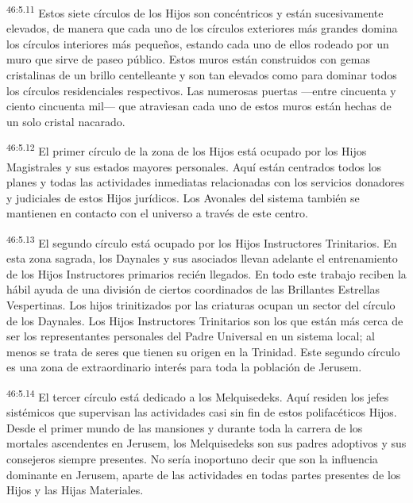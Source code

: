 \par
\textsuperscript{46:5.11} Estos siete círculos de los Hijos son concéntricos y están sucesivamente elevados, de manera que cada uno de los círculos exteriores más grandes domina los círculos interiores más pequeños, estando cada uno de ellos rodeado por un muro que sirve de paseo público. Estos muros están construidos con gemas cristalinas de un brillo centelleante y son tan elevados como para dominar todos los círculos residenciales respectivos. Las numerosas puertas ---entre cincuenta y ciento cincuenta mil--- que atraviesan cada uno de estos muros están hechas de un solo cristal nacarado.

\par
\textsuperscript{46:5.12} El primer círculo de la zona de los Hijos está ocupado por los Hijos Magistrales y sus estados mayores personales. Aquí están centrados todos los planes y todas las actividades inmediatas relacionadas con los servicios donadores y judiciales de estos Hijos jurídicos. Los Avonales del sistema también se mantienen en contacto con el universo a través de este centro.

\par
\textsuperscript{46:5.13} El segundo círculo está ocupado por los Hijos Instructores Trinitarios. En esta zona sagrada, los Daynales y sus asociados llevan adelante el entrenamiento de los Hijos Instructores primarios recién llegados. En todo este trabajo reciben la hábil ayuda de una división de ciertos coordinados de las Brillantes Estrellas Vespertinas. Los hijos trinitizados por las criaturas ocupan un sector del círculo de los Daynales. Los Hijos Instructores Trinitarios son los que están más cerca de ser los representantes personales del Padre Universal en un sistema local; al menos se trata de seres que tienen su origen en la Trinidad. Este segundo círculo es una zona de extraordinario interés para toda la población de Jerusem.

\par
\textsuperscript{46:5.14} El tercer círculo está dedicado a los Melquisedeks. Aquí residen los jefes sistémicos que supervisan las actividades casi sin fin de estos polifacéticos Hijos. Desde el primer mundo de las mansiones y durante toda la carrera de los mortales ascendentes en Jerusem, los Melquisedeks son sus padres adoptivos y sus consejeros siempre presentes. No sería inoportuno decir que son la influencia dominante en Jerusem, aparte de las actividades en todas partes presentes de los Hijos y las Hijas Materiales.

